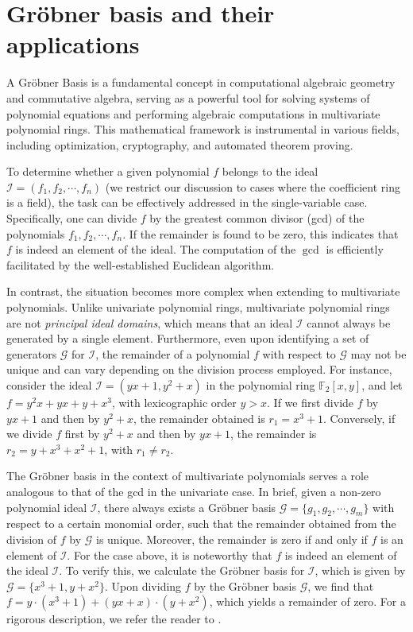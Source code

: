 \documentclass[aps,prl,english,superscriptaddress,twocolumn,tightenlines,showpacs,longbibliography,floatfix,amsfonts]{revtex4-2}
\begin{document}
\section{Gr\"{o}bner basis and their applications}
A Gr\"obner Basis is a fundamental concept in computational algebraic geometry and commutative algebra, serving as a powerful tool for solving systems of polynomial equations and performing algebraic computations in multivariate polynomial rings. This mathematical framework is instrumental in various fields, including optimization, cryptography, and automated theorem proving. 

To determine whether a given polynomial $f$ belongs to the ideal $\mathcal{I}=(f_1,f_2,\cdots, f_n)$ (we restrict our discussion to cases where the coefficient ring is a field), the task can be effectively addressed in the single-variable case. Specifically, one can divide $f$ by the greatest common divisor (gcd) of the polynomials $f_1,f_2,\cdots, f_n$. If the remainder is found to be zero, this indicates that $f$ is indeed an element of the ideal. The computation of the $\gcd$ is efficiently facilitated by the well-established Euclidean algorithm. 

In contrast, the situation becomes more complex when extending to multivariate polynomials. Unlike univariate polynomial rings, multivariate polynomial rings are not \textit{principal ideal domains}, which means that an ideal $\mathcal{I}$ cannot always be generated by a single element. Furthermore, even upon identifying a set of generators $\mathcal{G}$ for $\mathcal{I}$, the remainder of a polynomial $f$ with respect to $\mathcal{G}$ may not be unique and can vary depending on the division process employed. For instance, consider the ideal $\mathcal{I}=(yx+1, y^2+x)$ in the polynomial ring $\mathbb{F}_2[x,y]$, and let $f=y^2x+yx+y+x^3$, with lexicographic order $y>x$. If we first divide $f$ by $yx+1$ and then by $y^2+x$, the remainder obtained is $r_1=x^3+1$. Conversely, if we divide $f$ first by $y^2+x$ and then by $yx+1$, the remainder is $r_2 = y + x^3 + x^2 + 1$, with $r_1 \neq r_2$. 

The Gr\"obner basis in the context of multivariate polynomials serves a role analogous to that of the gcd in the univariate case. In brief, given a non-zero polynomial ideal $\mathcal{I}$, there always exists a Gr\"obner basis $\mathcal{G}=\{g_1,g_2,\cdots,g_m\}$ with respect to a certain monomial order, such that the remainder obtained from the division of $f$ by $\mathcal{G}$ is unique. Moreover, the remainder is zero if and only if $f$ is an element of $\mathcal{I}$. For the case above, it is noteworthy that $f$ is indeed an element of the ideal $\mathcal{I}$. To verify this, we calculate the Gr\"obner basis for $\mathcal{I}$, which is given by $\mathcal{G} = \{x^3+1, y+x^2\}$. Upon dividing $f$  by the Gr\"obner basis $\mathcal{G}$, we find that $f = y \cdot (x^3+1)+(yx+x) \cdot (y+x^2)$, which yields a remainder of zero. For a rigorous description, we refer the reader to \cite{adams94}.
\end{document}
